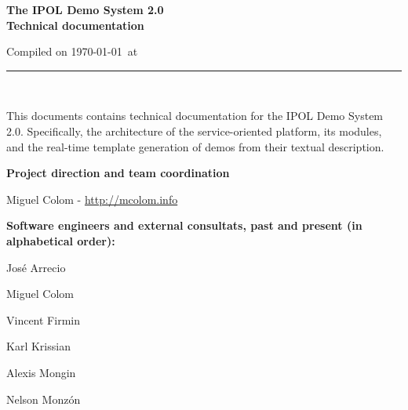 \documentclass[a4paper,12pt]{article}
\begin{document}
\begin{titlepage}

\begin{center}
\vspace*{-1in}

\vspace*{0.6in}
\begin{Large}
\textbf{The IPOL Demo System 2.0 \\Technical documentation} \\
\end{Large}

\vspace*{0.6in}

\small{Compiled on \today\ at \currenttime}

\vspace*{0.6in}
\rule{80mm}{0.1mm}\\
\vspace*{0.1in}
\end{center}

\end{titlepage}

This documents contains technical documentation for the IPOL Demo System 2.0. Specifically, the architecture of the service-oriented platform, its modules, and the real-time template generation of demos from their textual description.
\vspace*{0.6in}

\textbf{Project direction and team coordination}

Miguel Colom - \url{http://mcolom.info}

\vspace*{0.2in}

\textbf{Software engineers and external consultats, past and present (in alphabetical order):}


José Arrecio

Miguel Colom

Vincent Firmin

Karl Krissian

Alexis Mongin

Nelson Monzón


\newpage

\tableofcontents
\newpage
\listoffigures
\newpage


\end{document}
